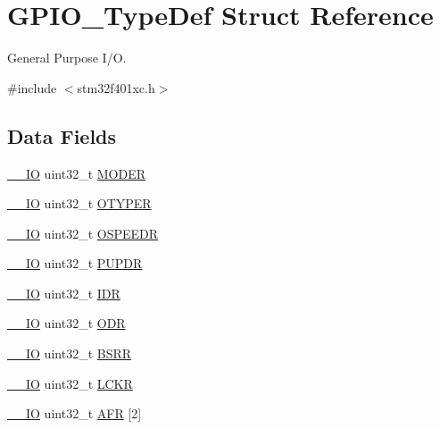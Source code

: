 \hypertarget{struct_g_p_i_o___type_def}{}\section{G\+P\+I\+O\+\_\+\+Type\+Def Struct Reference}
\label{struct_g_p_i_o___type_def}


General Purpose I/O.  




{\ttfamily \#include $<$stm32f401xc.\+h$>$}

\subsection*{Data Fields}
\begin{DoxyCompactItemize}
\item 
\hyperlink{core__sc300_8h_aec43007d9998a0a0e01faede4133d6be}{\+\_\+\+\_\+\+IO} uint32\+\_\+t \hyperlink{struct_g_p_i_o___type_def_a2b671a94c63a612f81e0e9de8152d01c}{M\+O\+D\+ER}
\item 
\hyperlink{core__sc300_8h_aec43007d9998a0a0e01faede4133d6be}{\+\_\+\+\_\+\+IO} uint32\+\_\+t \hyperlink{struct_g_p_i_o___type_def_a9543592bda60cb5261075594bdeedac9}{O\+T\+Y\+P\+ER}
\item 
\hyperlink{core__sc300_8h_aec43007d9998a0a0e01faede4133d6be}{\+\_\+\+\_\+\+IO} uint32\+\_\+t \hyperlink{struct_g_p_i_o___type_def_a328d16cc6213783ede54e4059ffd50a3}{O\+S\+P\+E\+E\+DR}
\item 
\hyperlink{core__sc300_8h_aec43007d9998a0a0e01faede4133d6be}{\+\_\+\+\_\+\+IO} uint32\+\_\+t \hyperlink{struct_g_p_i_o___type_def_abeed38529bd7b8de082e490e5d4f1727}{P\+U\+P\+DR}
\item 
\hyperlink{core__sc300_8h_aec43007d9998a0a0e01faede4133d6be}{\+\_\+\+\_\+\+IO} uint32\+\_\+t \hyperlink{struct_g_p_i_o___type_def_a328d2fe9ef1d513c3a97d30f98f0047c}{I\+DR}
\item 
\hyperlink{core__sc300_8h_aec43007d9998a0a0e01faede4133d6be}{\+\_\+\+\_\+\+IO} uint32\+\_\+t \hyperlink{struct_g_p_i_o___type_def_abff7fffd2b5a718715a130006590c75c}{O\+DR}
\item 
\hyperlink{core__sc300_8h_aec43007d9998a0a0e01faede4133d6be}{\+\_\+\+\_\+\+IO} uint32\+\_\+t \hyperlink{struct_g_p_i_o___type_def_ac25dd6b9e3d55e17589195b461c5ec80}{B\+S\+RR}
\item 
\hyperlink{core__sc300_8h_aec43007d9998a0a0e01faede4133d6be}{\+\_\+\+\_\+\+IO} uint32\+\_\+t \hyperlink{struct_g_p_i_o___type_def_a2612a0f4b3fbdbb6293f6dc70105e190}{L\+C\+KR}
\item 
\hyperlink{core__sc300_8h_aec43007d9998a0a0e01faede4133d6be}{\+\_\+\+\_\+\+IO} uint32\+\_\+t \hyperlink{struct_g_p_i_o___type_def_a7100354be30ab2f2248e2c3e94ace993}{A\+FR} \mbox{[}2\mbox{]}
\end{DoxyCompactItemize}


